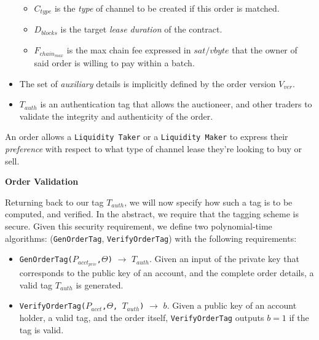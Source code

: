 \documentclass[10pt,a4paper]{article}
\theoremstyle{definition}
\begin{document}
\begin{itemize}
\begin{itemize}
        \item $C_{type}$ is the \emph{type} of channel to be created if this
            order is matched.

        \item $D_{blocks}$ is the target \emph{lease duration} of the contract.

        \item $F_{chain_{max}}$ is the max chain fee expressed in $sat/vbyte$
            that the owner of said order is willing to pay within a batch.

    \end{itemize}

    \item The set of \emph{auxiliary} details is implicitly defined by the
        order version $V_{ver}$.

    \item $T_{auth}$ is an authentication tag that allows the auctioneer, and
        other traders to validate the integrity and authenticity of the order.


\end{itemize}

An order allows a \texttt{Liquidity Taker} or a \texttt{Liquidity Maker} to
express their \emph{preference} with respect to what type of channel lease
they're looking to buy or sell.

\begin{center}
\textbf{Order Validation}
\end{center}

Returning back to our tag $T_{auth}$, we will now specify how such a tag is to
be computed, and verified. In the abstract, we require that the tagging scheme
is \seufcma \enspace secure. Given this security requirement, we define
two polynomial-time algorithms: (\texttt{GenOrderTag}, \texttt{VerifyOrderTag})
with the following requirements:

\begin{itemize}
    \item \texttt{GenOrderTag($P_{acct_{priv}}$,$\Theta$)} $\rightarrow$
        $T_{auth}$.  Given an input of the private key that corresponds to the
        public key of an account, and the complete order details, a valid tag
        $T_{auth}$ is generated.

    \item \texttt{VerifyOrderTag($P_{acct}$,$\Theta$, $T_{auth}$)}
        $\rightarrow$ $b$.  Given a public key of an account holder, a valid
        tag, and the order itself, \texttt{VerifyOrderTag} outputs $b=1$ if the
        tag is valid.
\end{itemize}
\end{document}
